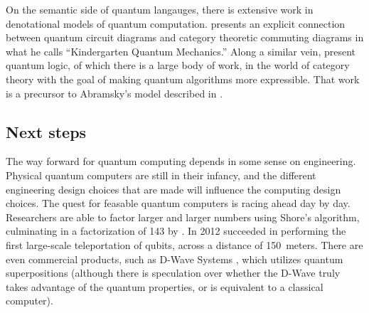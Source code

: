 On the semantic side of quantum langauges, there is extensive work in denotational 
models of quantum computation. \cite{coecke2005kindergarten} presents an
explicit connection between quantum circuit diagrams and category theoretic 
commuting diagrams in what he calls ``Kindergarten Quantum Mechanics.''
Along a similar vein, \cite{abramsky2006categorical} present quantum logic,
of which there is a large body of work, in the world of category theory with
the goal of making quantum algorithms more expressible. That work is a precursor
to Abramsky's model described in .

\subsection{Next steps}

The way forward for quantum computing depends in some sense on engineering. 
Physical quantum computers are still in their infancy, and the different 
engineering design choices that are made will influence the computing design choices.
The quest for feasable quantum computers is racing ahead day by day.
Researchers are able to factor larger and larger numbers using Shore's algorithm,
culminating in a factorization of 143 by \cite{xu2012quantum}.
In 2012 \citet{bao2012quantum} succeeded in performing the first large-scale teleportation
of qubits, across a distance of 150~meters.
There are even commercial products, such as D-Wave Systems \citep{johnson2011quantum}, which utilizes
quantum superpositions (although there is speculation over whether the D-Wave truly takes
advantage of the quantum properties, or is equivalent to a classical computer).
